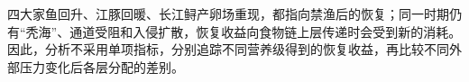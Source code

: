 四大家鱼回升、江豚回暖、长江鲟产卵场重现，都指向禁渔后的恢复；同一时期仍有“秃海”、通道受阻和入侵扩散，恢复收益向食物链上层传递时会受到新的消耗。因此，分析不采用单项指标，分别追踪不同营养级得到的恢复收益，再比较不同外部压力变化后各层分配的差别。
